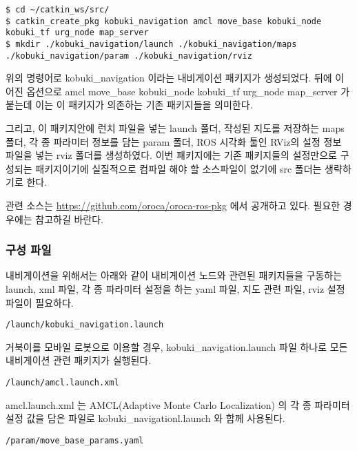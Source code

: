 \vspace{\baselineskip}
\begin{lstlisting}[language=ROS]
$ cd ~/catkin_ws/src/
$ catkin_create_pkg kobuki_navigation amcl move_base kobuki_node kobuki_tf urg_node map_server
$ mkdir ./kobuki_navigation/launch ./kobuki_navigation/maps ./kobuki_navigation/param ./kobuki_navigation/rviz
\end{lstlisting}

위의 명령어로 kobuki\_navigation 이라는 내비게이션 패키지가 생성되었다. 뒤에 이어진 옵션으로 amcl move\_base kobuki\_node kobuki\_tf urg\_node map\_server 가 붙는데 이는 이 패키지가 의존하는 기존 패키지들을 의미한다. 

그리고, 이 패키지안에 런치 파일을 넣는 launch 폴더, 작성된 지도를 저장하는 maps폴더, 각 종 파라미터 정보를 담는 param 폴더, ROS 시각화 툴인 RViz의 설정 정보 파일을 넣는 rviz 폴더를 생성하였다. 이번 패키지에는 기존 패키지들의 설정만으로 구성되는 패키지이기에 실질적으로 컴파일 해야 할 소스파일이 없기에 src 폴더는 생략하기로 한다.

관련 소스는 \url{https://github.com/oroca/oroca-ros-pkg} 에서 공개하고 있다. 필요한 경우에는 참고하길 바란다.

\subsubsection{구성 파일}

내비게이션을 위해서는 아래와 같이 내비게이션 노드와 관련된 패키지들을 구동하는 launch, xml 파일, 각 종 파라미터 설정을 하는 yaml 파일, 지도 관련 파일, rviz 설정 파일이 필요하다.

\vspace{\baselineskip}
\begin{lstlisting}[language=ROS]
/launch/kobuki_navigation.launch
\end{lstlisting}

거북이를 모바일 로봇으로 이용할 경우, kobuki\_navigation.launch 파일 하나로 모든 내비게이션 관련 패키지가 실행된다. 

\vspace{\baselineskip}
\begin{lstlisting}[language=ROS]
/launch/amcl.launch.xml
\end{lstlisting}

amcl.launch.xml 는 AMCL(Adaptive Monte Carlo Localization) 의 각 종 파라미터 설정 값을 담은 파일로 kobuki\_navigationl.launch 와 함께 사용된다.

\vspace{\baselineskip}
\begin{lstlisting}[language=ROS]
/param/move_base_params.yaml
\end{lstlisting}

